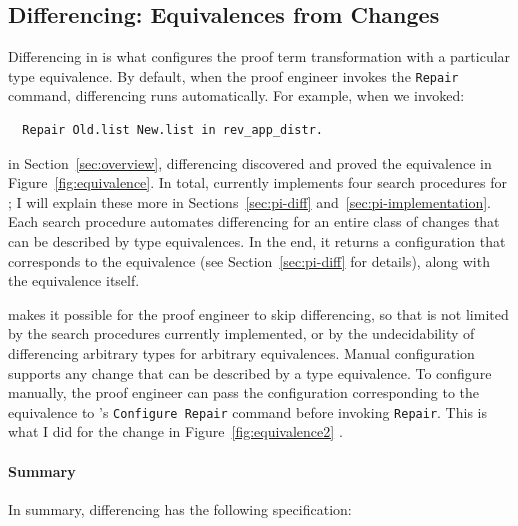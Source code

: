 \subsection{Differencing: Equivalences from Changes}
\label{sec:pi-spec-diff}

Differencing in \toolnamec is what configures the proof term transformation with a particular type equivalence.
By default, when the proof engineer invokes the \lstinline{Repair} command, differencing runs automatically.
For example, when we invoked:

\begin{lstlisting}
  Repair Old.list New.list in rev_app_distr.
\end{lstlisting}
in Section~\ref{sec:overview}, differencing discovered and proved the equivalence in Figure~\ref{fig:equivalence}.
In total, \toolnamec currently implements four search procedures for ;
I will explain these more in Sections~\ref{sec:pi-diff} and~\ref{sec:pi-implementation}.
Each search procedure automates differencing for an entire class of changes that can be described by type equivalences. 
In the end, it returns a configuration that corresponds to the equivalence (see Section~\ref{sec:pi-diff} for details),
along with the equivalence itself.

 makes it possible for the proof engineer to skip differencing, so that \toolnamec is not limited by the 
search procedures currently implemented, or by the undecidability of differencing arbitrary types for arbitrary equivalences.
Manual configuration supports any change that can be described by a type equivalence.
To configure \toolnamec manually, the proof engineer can pass the configuration corresponding to the equivalence to \toolnamec's \lstinline{Configure Repair} command before invoking \lstinline{Repair}.
This is what I did for the change in Figure~\ref{fig:equivalence2} \href{https://github.com/uwplse/pumpkin-pi/blob/v2.0.0/plugin/coq/playground/constr_refactor.v}{}.

\paragraph{Summary}

In summary, differencing has the following specification:

